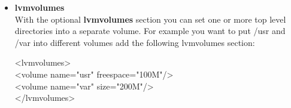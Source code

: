 \begin{itemize}
	\begin{Command}{12cm}
	<split>\\
	\hspace*{1cm}<temporary>\\
	\hspace*{2cm}<!-- read/write access to: -->\\
	\hspace*{2cm}<file name="/var"/>\\
	\hspace*{2cm}<file name="/var/*"/>\\
	\hspace*{2cm}<!-- but not on this file: -->\\
	\hspace*{2cm}<except name="/etc/shadow"/>\\
	\hspace*{1cm}</temporary>\\
	\hspace*{1cm}<persistent>\\
	\hspace*{2cm}<!-- persistent read/write access to: -->\\
	\hspace*{2cm}<file name="/etc"/>\\
	\hspace*{2cm}<file name="/etc/*"/>\\
	\hspace*{2cm}<!-- but not on this file: -->\\
	\hspace*{2cm}<except name="/etc/passwd"/>\\
	\hspace*{1cm}</persistent>\\
	</split>
	\end{Command}

\item \textbf{lvmvolumes}\\
	With the optional \textbf{lvmvolumes} section you can set one or
	more top level directories into a separate volume. For example you
	want to put /usr and /var into different volumes add the following
	lvmvolumes section:

	\begin{Command}{12cm}
	<lvmvolumes>\\
	\hspace*{1cm}<volume name="usr" freespace="100M"/>\\
	\hspace*{1cm}<volume name="var" size="200M"/>\\
	</lvmvolumes>
	\end{Command}


\end{itemize}
